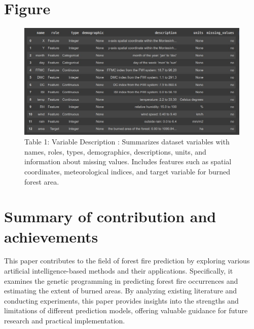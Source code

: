 \section{Figure}
\begin{figure}[ht]
    \centering
    \includegraphics[scale=0.6]{figures/Summary data set.jpg}
    \caption{Table 1: Variable Description : Summarizes dataset variables with names, roles, types, demographics, descriptions, units, and information about missing values. Includes features such as spatial coordinates, meteorological indices, and target variable for burned forest area.}
\end{figure}



\section{Summary of contribution and achievements}
This paper contributes to the field of forest fire prediction by exploring various artificial intelligence-based methods and their applications. Specifically, it examines the genetic programming in predicting forest fire occurrences and estimating the extent of burned areas. By analyzing existing literature and conducting experiments, this paper provides insights into the strengths and limitations of different prediction models, offering valuable guidance for future research and practical implementation.



